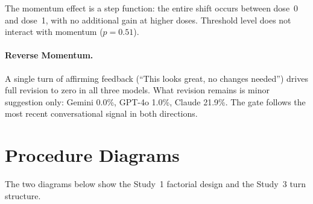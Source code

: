 The momentum effect is a step function: the entire shift occurs between dose~0 and dose~1, with no additional gain at higher doses. Threshold level does not interact with momentum ($p = 0.51$).

\paragraph{Reverse Momentum.} A single turn of affirming feedback (``This looks great, no changes needed'') drives full revision to zero in all three models. What revision remains is minor suggestion only: Gemini 0.0\%, GPT-4o 1.0\%, Claude 21.9\%. The gate follows the most recent conversational signal in both directions.

\section{Procedure Diagrams}
The two diagrams below show the Study~1 factorial design and the Study~3 turn structure.
\label{sec:appendix-pipeline}

